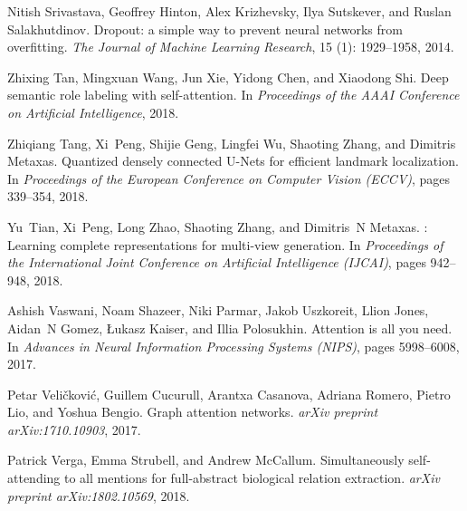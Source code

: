 \documentclass{bmvc2k}
\begin{document}
\begin{thebibliography}{42}
Nitish Srivastava, Geoffrey Hinton, Alex Krizhevsky, Ilya Sutskever, and Ruslan
  Salakhutdinov.
\newblock Dropout: a simple way to prevent neural networks from overfitting.
\newblock \emph{The Journal of Machine Learning Research}, 15
  (1): 1929--1958, 2014.

Zhixing Tan, Mingxuan Wang, Jun Xie, Yidong Chen, and Xiaodong Shi.
\newblock Deep semantic role labeling with self-attention.
\newblock In \emph{Proceedings of the AAAI Conference on Artificial
  Intelligence}, 2018.

Zhiqiang Tang, Xi~Peng, Shijie Geng, Lingfei Wu, Shaoting Zhang, and Dimitris
  Metaxas.
\newblock Quantized densely connected {U-Nets} for efficient landmark
  localization.
\newblock In \emph{Proceedings of the European Conference on Computer Vision
  (ECCV)}, pages 339--354, 2018.

Yu~Tian, Xi~Peng, Long Zhao, Shaoting Zhang, and Dimitris~N Metaxas.
: Learning complete representations for multi-view
  generation.
\newblock In \emph{Proceedings of the International Joint Conference on
  Artificial Intelligence (IJCAI)}, pages 942--948, 2018.

Ashish Vaswani, Noam Shazeer, Niki Parmar, Jakob Uszkoreit, Llion Jones,
  Aidan~N Gomez, {\L}ukasz Kaiser, and Illia Polosukhin.
\newblock Attention is all you need.
\newblock In \emph{Advances in Neural Information Processing Systems (NIPS)},
  pages 5998--6008, 2017.

Petar Veli{\v{c}}kovi{\'c}, Guillem Cucurull, Arantxa Casanova, Adriana Romero,
  Pietro Lio, and Yoshua Bengio.
\newblock Graph attention networks.
\newblock \emph{arXiv preprint arXiv:1710.10903}, 2017.

Patrick Verga, Emma Strubell, and Andrew McCallum.
\newblock Simultaneously self-attending to all mentions for full-abstract
  biological relation extraction.
\newblock \emph{arXiv preprint arXiv:1802.10569}, 2018.


\end{thebibliography}
\end{document}
